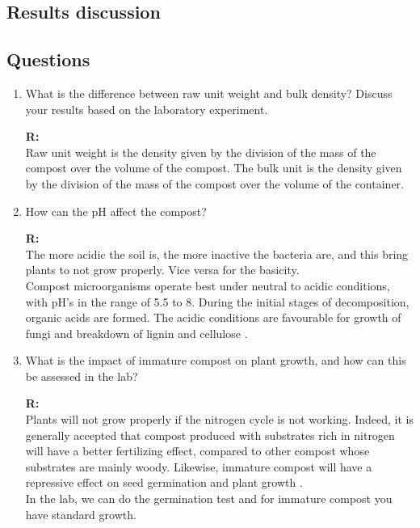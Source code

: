 \documentclass{article}
\begin{document}
\subsection{Results discussion}

\subsection{Questions}
\begin{enumerate}
    \item What is the difference between raw unit weight and bulk density? Discuss your
        results based on the laboratory experiment.

        \textbf{R:\\}
        Raw unit weight is the density given by the division of the mass of the compost
        over the volume of the compost. The bulk unit is the density given by the division
        of the mass of the compost over the volume of the container.

    \item How can the pH affect the compost?
    
        \textbf{R:\\}
        The more acidic the soil is, the more inactive the bacteria are, and this bring
        plants to not grow properly. Vice versa for the basicity.\\
        Compost microorganisms operate best under neutral to acidic conditions, with pH's
        in the range of 5.5 to 8. During the initial stages of decomposition, organic
        acids are formed. The acidic conditions are favourable for growth of fungi and
        breakdown of lignin and cellulose \parencite{cornell}.

    \item What is the impact of immature compost on plant growth, and how can this be
        assessed in the lab?

        \textbf{R:\\}
        Plants will not grow properly if the nitrogen cycle is not working. Indeed, it is
        generally accepted that compost produced with substrates rich in nitrogen will
        have a better fertilizing effect, compared to other compost whose substrates are
        mainly woody. Likewise, immature compost will have a repressive effect on seed
        germination and plant growth \parencite{tamakloe2021}.\\
        In the lab, we can do the germination test and for immature compost you have
        standard growth.


\end{enumerate}
\end{document}
